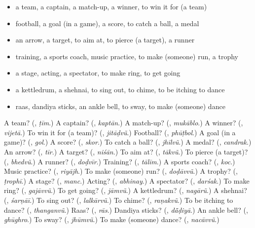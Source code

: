 \begin{itemize}
\raggedright
  \item a team, a captain, a match-up, a winner, to win it for (a team)
  \item football, a goal (in a game), a score, to catch a ball, a medal
  \item an arrow, a target, to aim at, to pierce (a target), a runner
  \item training, a sports coach, music practice, to make (someone) run, a trophy
  \item a stage, acting, a spectator, to make ring, to get going
  \item a kettledrum, a shehnai, to sing out, to chime, to be itching to dance
  \item raas, dandiya sticks, an ankle bell, to sway, to make (someone) dance
\end{itemize}

\begin{tcolorbox}[breakable,colback=teal!4,colframe=teal!35!black,title={Before you move on}]
A team? (\textbf{}, \emph{ṭīm}.) A captain? (\textbf{}, \emph{kaptān}.) A match-up? (\textbf{}, \emph{mukāblo}.) A winner? (\textbf{}, \emph{vijetā}.) To win it for (a team)? (\textbf{}, \emph{jitāḍvũ}.) Football? (\textbf{}, \emph{phūṭbol}.) A goal (in a game)? (\textbf{}, \emph{gol}.) A score? (\textbf{}, \emph{skor}.) To catch a ball? (\textbf{}, \emph{jhīlvũ}.) A medal? (\textbf{}, \emph{candrak}.) An arrow? (\textbf{}, \emph{tīr}.) A target? (\textbf{}, \emph{niśān}.) To aim at? (\textbf{}, \emph{tākvũ}.) To pierce (a target)? (\textbf{}, \emph{bhedvũ}.) A runner? (\textbf{}, \emph{doḍvīr}.) Training? (\textbf{}, \emph{tālīm}.) A sports coach? (\textbf{}, \emph{koc}.) Music practice? (\textbf{}, \emph{riyājh}.) To make (someone) run? (\textbf{}, \emph{doḍāvvũ}.) A trophy? (\textbf{}, \emph{ṭrophī}.) A stage? (\textbf{}, \emph{manc}.) Acting? (\textbf{}, \emph{abhinay}.) A spectator? (\textbf{}, \emph{darśak}.) To make ring? (\textbf{}, \emph{gajāvvũ}.) To get going? (\textbf{}, \emph{jāmvũ}.) A kettledrum? (\textbf{}, \emph{nagārũ}.) A shehnai? (\textbf{}, \emph{śarṇāī}.) To sing out? (\textbf{}, \emph{lalkārvũ}.) To chime? (\textbf{}, \emph{raṇakvũ}.) To be itching to dance? (\textbf{}, \emph{thanganvũ}.) Raas? (\textbf{}, \emph{rās}.) Dandiya sticks? (\textbf{}, \emph{dā̃ḍiyā}.) An ankle bell? (\textbf{}, \emph{ghūghro}.) To sway? (\textbf{}, \emph{jhūmvũ}.) To make (someone) dance? (\textbf{}, \emph{nacāvvũ}.)
\end{tcolorbox}

